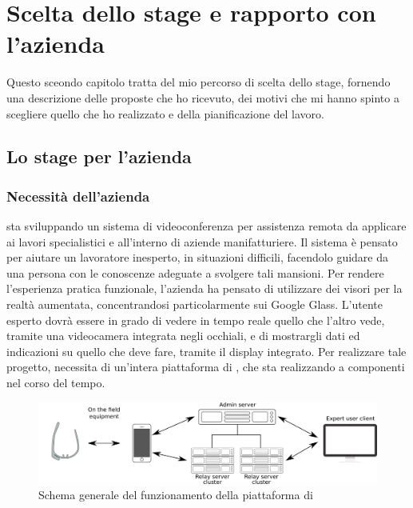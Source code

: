 \chapter{Scelta dello stage e rapporto con l'azienda}
Questo sceondo capitolo tratta del mio percorso di scelta dello stage, fornendo una descrizione delle proposte che ho ricevuto, dei motivi che mi hanno spinto a scegliere quello che ho realizzato e della pianificazione del lavoro.

\section{Lo stage per l'azienda}

   \subsection{Necessità dell'azienda}
   \nomeAzienda{} sta sviluppando un sistema di videoconferenza per assistenza remota da applicare ai lavori specialistici e all'interno di aziende manifatturiere. Il sistema è pensato per aiutare un lavoratore inesperto, in situazioni difficili, facendolo guidare da una persona con le conoscenze adeguate a svolgere tali mansioni. Per rendere l'esperienza pratica funzionale, l'azienda ha pensato di utilizzare dei visori per la realtà aumentata, concentrandosi particolarmente sui Google Glass. L'utente esperto dovrà essere in grado di vedere in tempo reale quello che l'altro vede, tramite una videocamera integrata negli occhiali, e di mostrargli dati ed indicazioni su quello che deve fare, tramite il display integrato. Per realizzare tale progetto, \nomeAzienda{} necessita di un'intera piattaforma di , che sta realizzando a componenti nel corso del tempo.
   \begin{figure}[H]
      \begin{center}
         \includegraphics[width=16.5cm,keepaspectratio]{immagini/erastreaming-schema}
         \caption{Schema generale del funzionamento della piattaforma di }
      \end{center}
   \end{figure}
